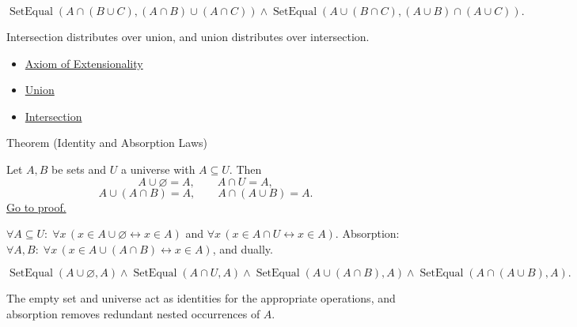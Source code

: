 \begin{remark*}
\[
  \operatorname{SetEqual}(A\cap(B\cup C),(A\cap B)\cup(A\cap C))
  \wedge
  \operatorname{SetEqual}(A\cup(B\cap C),(A\cup B)\cap(A\cup C)).
\]
\end{remark*}

\begin{remark*}[Interpretation]
Intersection distributes over union, and union distributes over intersection.
\end{remark*}

\begin{dependencies}
\begin{itemize}
  \item \hyperref[ax:extensionality]{Axiom of Extensionality}
  \item \hyperref[def:union]{Union}
  \item \hyperref[def:intersection]{Intersection}
\end{itemize}
\end{dependencies}

\begin{theorembox}{Theorem (Identity and Absorption Laws)}
\begin{theorem}\label{thm:identity-absorption}
Let $A,B$ be sets and $U$ a universe with $A \subseteq U$. Then
\[
A \cup \varnothing = A,
\qquad
A \cap U = A,
\]
\[
A \cup (A \cap B) = A,
\qquad
A \cap (A \cup B) = A.
\]
\hyperref[prf:identity-absorption]{Go to proof.}
\end{theorem}
\end{theorembox}

\begin{remark*}
$\forall A \subseteq U:\; \forall x\,(x \in A \cup \varnothing \leftrightarrow x \in A)$ and $\forall x\,(x \in A \cap U \leftrightarrow x \in A)$.
Absorption: $\forall A, B:\; \forall x\,(x \in A \cup (A \cap B) \leftrightarrow x \in A)$, and dually.
\end{remark*}

\begin{remark*}
\[
  \operatorname{SetEqual}(A\cup\varnothing,A)
  \wedge
  \operatorname{SetEqual}(A\cap U,A)
  \wedge
  \operatorname{SetEqual}(A\cup(A\cap B),A)
  \wedge
  \operatorname{SetEqual}(A\cap(A\cup B),A).
\]
\end{remark*}

\begin{remark*}[Interpretation]
The empty set and universe act as identities for the appropriate operations,
and absorption removes redundant nested occurrences of $A$.
\end{remark*}

